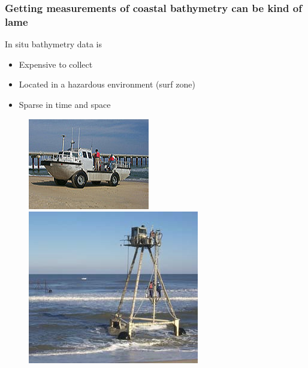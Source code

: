 \documentclass[7pt]{beamer}
\begin{document}
\begin{frame}
 \frametitle{Getting measurements of coastal bathymetry can be kind of lame}
 In situ bathymetry data is
 \begin{itemize}
 \item Expensive to collect
 \item Located in a hazardous environment (surf zone)
 \item Sparse in time and space
 \end{itemize}

\begin{figure}[h]
\includegraphics[width=.40\linewidth]{img/LARC.jpg}\hfill
\includegraphics[width=.40\linewidth]{img/CRAB2.JPG}
\end{figure}
\end{frame}



\end{document}
